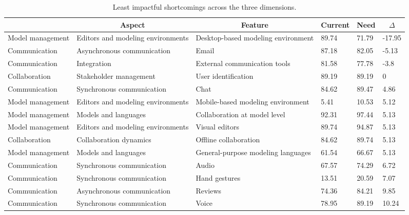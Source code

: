 
  \begin{table*}[]
  \centering
  \notsotiny
  \caption{ Least impactful shortcomings across the three dimensions.}
\label{tab:least-impactful}
\begin{tabular}{|l|l|l|l|l|l|}
  \hline
  \rowcolor[HTML]{C0C0C0}
    \multicolumn{1}{|c|}{Dimension} & \multicolumn{1}{c|}{Aspect} & \multicolumn{1}{c|}{Feature} & \multicolumn{1}{c|}{Current} & \multicolumn{1}{c|}{Need} & \multicolumn{1}{c|}{$\Delta$} \\ \hline
    Model management & Editors and modeling environments & Desktop-based modeling environment & 89.74 & 71.79 & -17.95 \\ \hline 
Communication & Asynchronous communication & Email & 87.18 & 82.05 & -5.13 \\ \hline 
Communication & Integration & External communication tools & 81.58 & 77.78 & -3.8 \\ \hline 
Collaboration & Stakeholder management & User identification & 89.19 & 89.19 & 0 \\ \hline 
Communication & Synchronous communication & Chat & 84.62 & 89.47 & 4.86 \\ \hline 
Model management & Editors and modeling environments & Mobile-based modeling environment & 5.41 & 10.53 & 5.12 \\ \hline 
Model management & Models and languages & Collaboration at model level & 92.31 & 97.44 & 5.13 \\ \hline 
Model management & Editors and modeling environments & Visual editors & 89.74 & 94.87 & 5.13 \\ \hline 
Collaboration & Collaboration dynamics & Offline collaboration & 84.62 & 89.74 & 5.13 \\ \hline 
Model management & Models and languages & General-purpose modeling languages & 61.54 & 66.67 & 5.13 \\ \hline 
Communication & Synchronous communication & Audio & 67.57 & 74.29 & 6.72 \\ \hline 
Communication & Synchronous communication & Hand gestures & 13.51 & 20.59 & 7.07 \\ \hline 
Communication & Asynchronous communication & Reviews & 74.36 & 84.21 & 9.85 \\ \hline 
Communication & Synchronous communication & Voice & 78.95 & 89.19 & 10.24 \\ \hline 

\end{tabular}
\end{table*}
